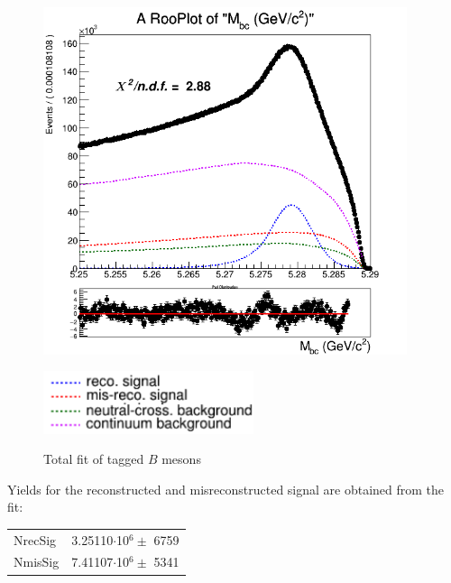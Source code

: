 \begin{figure}[H]
\begin{minipage}{.5\textwidth}
  \centering
  {\includegraphics[width=0.95\textwidth]{05-chargedControlSample/figs/stream3_chargedBtag_Total_fit_sigmaCB_misRecSigma_free_370bins.png}}
\end{minipage}%
\begin{minipage}{.5\textwidth}
{\includegraphics[width=0.55\textwidth]{05-chargedControlSample/figs/legend.png}}
\end{minipage}
\caption{Total fit of tagged $B$ mesons}
\end{figure}


Yields for the reconstructed and misreconstructed signal are obtained from the fit:

\vspace{0.5 cm}
\begin{tabular}{ |p{2cm}||p{3.8cm}|  }

 \hline
 NrecSig  & 3.25110$\cdot$10$^6 \pm$ 6759\\
 NmisSig &  7.41107$\cdot$10$^6 \pm$ 5341 \\
 \hline
\end{tabular}



